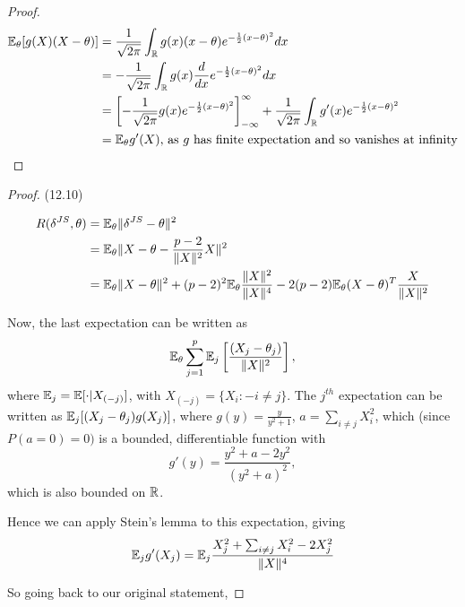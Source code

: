 \documentclass[a4paper]{article}
\begin{document}
\begin{proof}
	\begin{align*}
		\mathbb{E}_{\theta} [g(X)(X-\theta)] &= \frac{1}{\sqrt{2\pi} } \int_{\mathbb{R}} g(x)(x-\theta) e^{-\frac{1}{2} (x-\theta)^2} dx\\
			&= -\frac{1}{\sqrt{2\pi} } \int_{\mathbb{R}} g(x) \frac{d}{dx} e^{- \frac{1}{2} (x-\theta)^2} dx \\
			&= \left[ -\frac{1}{\sqrt{2\pi} } g(x) e^{- \frac{1}{2} (x-\theta)^2} \right]_{-\infty}^{\infty} + \frac{1}{\sqrt{2\pi} } \int_{\mathbb{R}} g'(x) e^{- \frac{1}{2} (x-\theta)^2}\\
			&= \mathbb{E}_{\theta} g'(X) \text{, as $g$ has finite expectation and so vanishes at infinity} 
	\end{align*}
\end{proof}

\begin{proof} (12.10)

\begin{align*}
	R(\delta^{JS}, \theta) &= \mathbb{E}_{\theta} \|\delta^{JS} - \theta\|^2 \\
	&= \mathbb{E}_{\theta} \|X - \theta - \frac{p-2}{\|X\|^2}X\|^2 \\
	&= \mathbb{E}_{\theta} \|X-\theta\|^2 + (p-2)^2\mathbb{E}_{\theta}\frac{\|X\|^2}{\|X\|^{4}} - 2(p-2) \mathbb{E}_{\theta} (X-\theta)^{T}\frac{X}{\|X\|^2}
\end{align*}

Now, the last expectation can be written as
\[
	\mathbb{E}_{\theta} \sum_{j=1}^{p} \mathbb{E}_{j} \left[ \frac{(X_j - \theta_j)}{\|X\|^2} \right] 
,\]
where $\mathbb{E}_j = \mathbb{E} [\cdot | X_{(-j)}]$, with $X_{(-j)} = \{X_i : -i \neq j\} $. The $j ^{th}$ expectation can be written as $\mathbb{E}_j [(X_j - \theta_j) g(X_j)]$, where $g(y) = \frac{y}{y^2+1}$, $a = \sum_{i\neq j} X_i^2$, which (since $P\left( a=0 \right) =0)$ is a bounded, differentiable function with 
\[
	g'(y) = \frac{y^2+a-2y^2}{(y^2+a)^2}
,\] which is also bounded on $\mathbb{R}$.

Hence we can apply Stein's lemma to this expectation, giving
\begin{align*}
	\mathbb{E}_j g'(X_j) &= \mathbb{E}_j \frac{X_j^2 + \sum_{i\neq j}X_i^2 - 2X_j^2}{\|X\|^4} \\
\end{align*}

So going back to our original statement,


\end{proof}
\end{document}
